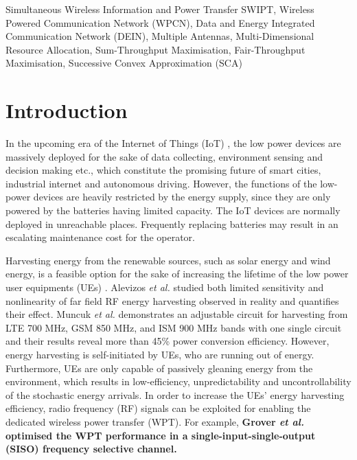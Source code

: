 \documentclass[12pt,draftcls,onecolumn,journal]{IEEEtran}
\begin{document}
\begin{IEEEkeywords}
	Simultaneous Wireless Information and Power Transfer SWIPT, Wireless Powered Communication Network (WPCN), Data and Energy Integrated Communication Network (DEIN), Multiple Antennas, Multi-Dimensional Resource Allocation, Sum-Throughput Maximisation, Fair-Throughput Maximisation, Successive Convex Approximation (SCA)
\end{IEEEkeywords}


\section{Introduction}

In the upcoming era of the Internet of Things (IoT) \cite{IOT}, the low power devices are massively deployed for the sake of data collecting, environment sensing and decision making etc., which constitute the promising future of smart cities, industrial internet and autonomous driving. However, the functions of the low-power devices are heavily restricted by the energy supply, since they are only powered by the batteries having limited capacity. The IoT devices are normally deployed in unreachable places. Frequently replacing batteries may result in an escalating maintenance cost for the operator.

Harvesting energy from the renewable sources, such as solar energy and wind energy, is a feasible option for the sake of increasing the lifetime of the low power user equipments (UEs) \cite{IEEE:EH}. Alevizos \textit{et al.} \cite{RF_EH_1} studied both limited sensitivity and nonlinearity of far field RF energy harvesting observed in reality and quantifies their effect. Muncuk \textit{et al. } \cite{RF_EH_2} demonstrates an adjustable circuit for harvesting from LTE 700 MHz, GSM 850 MHz, and ISM 900 MHz bands with one single circuit and their results reveal more than 45\% power conversion efficiency. However, energy harvesting is self-initiated by UEs, who are running out of energy. Furthermore, UEs are only capable of passively gleaning energy from the environment, which results in low-efficiency,  unpredictability and uncontrollability of the stochastic energy arrivals. In order to increase the UEs' energy harvesting efficiency, radio frequency (RF) signals can be exploited for enabling the dedicated wireless power transfer (WPT). For example, \textbf{Grover \textit{et al.} \cite{IEEE:swipt_2} optimised the WPT performance in a single-input-single-output (SISO) frequency selective channel. }
\end{document}
